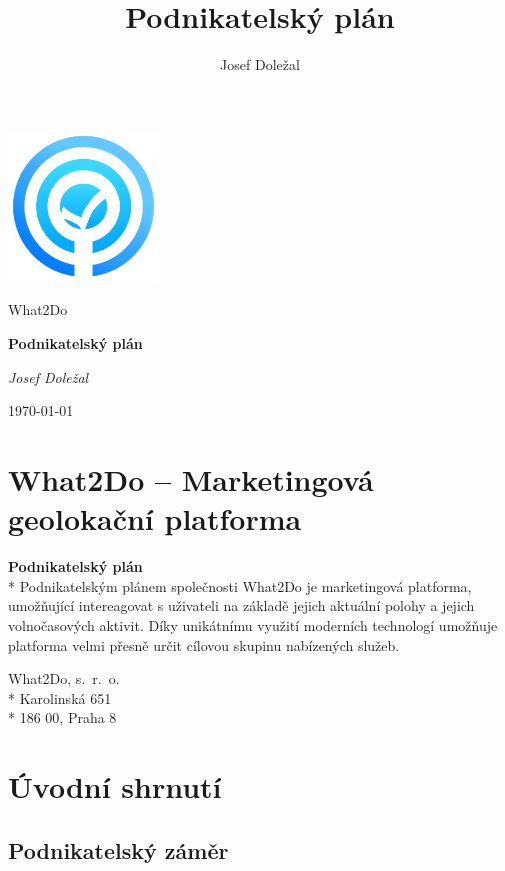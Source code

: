 \documentclass[12pt,czech]{article}
\title{Podnikatelský plán}
\author{Josef Doležal}
\begin{document}
\begin{titlepage}
    \vspace*{10cm}
	\centering
    \includegraphics[width=4cm]{BI-EMP/project-plan/assets/logo}\par\vspace{1.5cm}
	{\LARGE What2Do \par}
	\vspace{1.5cm}
	{\huge\bfseries Podnikatelský plán\par}
	\vspace{1.5cm}
	{\Large\itshape Josef Doležal\par}
	\vfill

	{\large \today\par}
\end{titlepage}

\newpage
\tableofcontents

\newpage
\section{What2Do -- Marketingová geolokační platforma}

\vfill

\textbf{{\large Podnikatelský plán}}\smallskip\\*
Podnikatelským plánem společnosti What2Do je marketingová platforma, umožňující intereagovat s uživateli na základě jejich aktuální polohy a jejich volnočasových aktivit.
Díky unikátnímu využití moderních technologí umožňuje platforma velmi přesně určit cílovou skupinu nabízených služeb.

\vfill
\noindent What2Do, s.~r.~o.\\*
Karolinská 651\\*
186 00, Praha 8

\newpage
\section{Úvodní shrnutí}

\subsection{Podnikatelský záměr}
\end{document}
